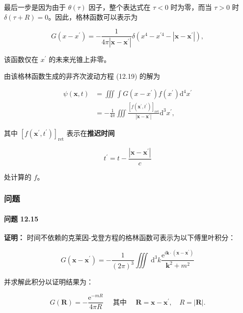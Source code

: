 最后一步是因为由于 \(\theta(\tau)\) 因子，整个表达式在 \(\tau < 0\)
时为零，而当 \(\tau > 0\) 时
\(\delta(\tau + R) = 0\)。因此，格林函数可以表示为

\[G\left( x - x^{\prime} \right) = - \frac{1}{4\pi\left| \mathbf{x} - \mathbf{x}^{\prime} \right|}\delta\left( x^{4} - x^{\prime 4} - \left| \mathbf{x} - \mathbf{x}^{\prime} \right| \right),\]

该函数仅在 \(x^{\prime}\) 的未来光锥上非零。

由该格林函数生成的非齐次波动方程 (12.19) 的解为

\[\begin{aligned}
\psi\left( \mathbf{x},t \right) & = \iiint\int G\left( x - x^{\prime} \right)f\left( x^{\prime} \right)\mathrm{d}^{4}x^{\prime} \\
 & = - \frac{1}{4\pi}\iiint\frac{\left\lbrack f\left( \mathbf{x}^{\prime},t^{\prime} \right) \right\rbrack_{\mathrm{ret}}}{\left| \mathbf{x} - \mathbf{x}^{\prime} \right|}\mathrm{d}^{3}x^{\prime},
\end{aligned}\]

其中
\(\left\lbrack f\left( \mathbf{x}^{\prime},t^{\prime} \right) \right\rbrack_{\mathrm{\text{ret}}}\)
表示在\textbf{推迟时间}

\[t^{\prime} = t - \frac{\left| \mathbf{x} - \mathbf{x}^{\prime} \right|}{c}\]

处计算的 \(f\)。

\subsubsection{问题}\label{ux95eeux9898-3}

\paragraph{问题 12.15}\label{ux95eeux9898-12.15}

\textbf{证明：}
时间不依赖的克莱因-戈登方程的格林函数可表示为以下傅里叶积分：

\[G\left( \mathbf{x} - \mathbf{x}^{\prime} \right) = - \frac{1}{(2\pi)^{3}}\iiint\mathrm{\: d}^{3}k\frac{\mathrm{e}^{i\mathbf{k} \cdot \left( \mathbf{x} - \mathbf{x}^{\prime} \right)}}{\mathbf{k}^{2} + m^{2}}\]

并求解此积分以证明结果为：

\[G\left( \mathbf{R} \right) = - \frac{\mathrm{e}^{- mR}}{4\pi R}\quad\mathrm{\text{ 其中 }}\quad\mathbf{R} = \mathbf{x} - \mathbf{x}^{\prime},\quad R = \left| \mathbf{R} \right|.\]

